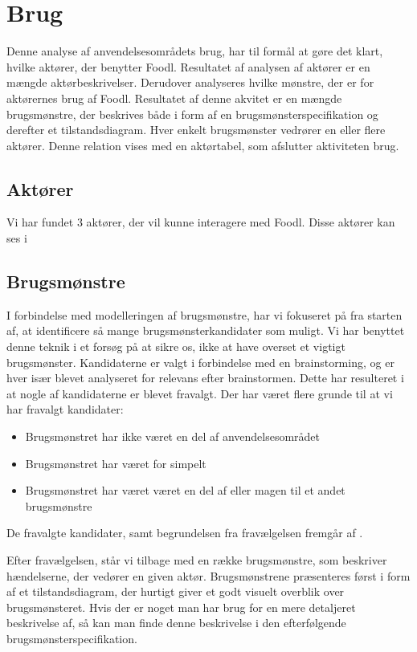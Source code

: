 \section{Brug}
\label{sec:brug}
Denne analyse af anvendelsesområdets brug, har til formål at gøre det klart, hvilke aktører, der benytter Foodl. Resultatet af analysen af aktører er en mængde aktørbeskrivelser. Derudover analyseres hvilke mønstre, der er for aktørernes brug af Foodl. Resultatet af denne akvitet er en mængde brugsmønstre, der beskrives både i form af en brugsmønsterspecifikation og derefter et tilstandsdiagram. Hver enkelt brugsmønster vedrører en eller flere aktører. Denne relation vises med en aktørtabel, som afslutter aktiviteten brug.

\subsection{Aktører}
\label{sec:aktoerer}
Vi har fundet 3 aktører, der vil kunne interagere med Foodl. Disse aktører kan ses i 



\subsection{Brugsmønstre}
\label{subsec:brugsmoenstre}
I forbindelse med modelleringen af brugsmønstre, har vi fokuseret på fra starten af, at identificere så mange brugsmønsterkandidater som muligt. Vi har benyttet denne teknik i et forsøg på at sikre os, ikke at have overset et vigtigt brugsmønster. Kandidaterne er valgt i forbindelse med en brainstorming, og er hver især blevet analyseret for relevans efter brainstormen. Dette har resulteret i at nogle af kandidaterne er blevet fravalgt. Der har været flere grunde til at vi har fravalgt kandidater:
\begin{itemize}
\item Brugsmønstret har ikke været en del af anvendelsesområdet
\item Brugsmønstret har været for simpelt
\item Brugsmønstret har været været en del af eller magen til et andet brugsmønstre
\end{itemize}
De fravalgte kandidater, samt begrundelsen fra fravælgelsen fremgår af .

Efter fravælgelsen, står vi tilbage med en række brugsmønstre, som beskriver hændelserne, der vedører en given aktør. Brugsmønstrene præsenteres først i form af et tilstandsdiagram, der hurtigt giver et godt visuelt overblik over brugsmønsteret. Hvis der er noget man har brug for en mere detaljeret beskrivelse af, så kan man finde denne beskrivelse i den efterfølgende brugsmønsterspecifikation.

